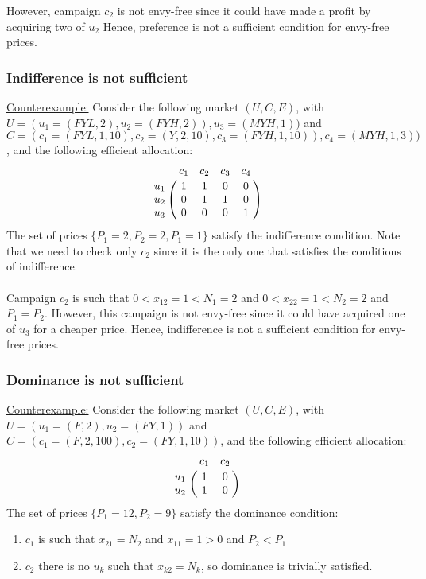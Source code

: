 \documentclass[12pt,letterpaper]{article}
\newcommand{\Campaign}{c}
\newcommand{\Campaigns}{C}
\newcommand{\User}{u}
\newcommand{\Users}{U}
\newcommand{\NumberOfUsers}{N}
\newcommand{\Edges}{E}
\newcommand{\Price}{P}
\newcommand{\AllocationMatrixEntry}{x}
\begin{document}
	However, campaign $\Campaign_{2}$ is not envy-free since it could have made a profit by acquiring two of $\User_{2}$ 
	Hence, preference is not a sufficient condition for envy-free prices.

	\subsubsection*{Indifference is not sufficient}
\underline{Counterexample:} Consider the following market $(\Users,\Campaigns,\Edges)$, with 
     $\Users =(\User_1 = (FYL, 2), \User_2 = (FYH, 2)), \User_3 = (MYH, 1))$ 
and  $\Campaigns =(\Campaign_1 = (FYL, 1,10),\Campaign_2 = (Y, 2,10), \Campaign_3 = (FYH, 1,10)), \Campaign_4 = (MYH, 1,3))$, and the following efficient allocation:
\[
		\bordermatrix{&		\Campaign_1 & \Campaign_2& \Campaign_3& \Campaign_4\cr
                	\User_1	& 1 		&  1 		& 0 		& 0 \cr
                	\User_2	& 0  		&  1		& 1 		& 0 \cr
                	\User_3	& 0		&  0		& 0 		& 1}
	\]
	The set of prices $\{\Price_1 = 2, \Price_2 = 2, \Price_1 = 1\}$ satisfy the indifference condition. Note that we need to check only $\Campaign_{2}$ since it is the only
	one that satisfies the conditions of indifference.\\\\
	Campaign $\Campaign_2$ is such that $0<\AllocationMatrixEntry_{12} = 1 < \NumberOfUsers_{1} = 2$ and $0<\AllocationMatrixEntry_{22} = 1 < \NumberOfUsers_{2} = 2$ and $\Price_1 = \Price_2$. However, this campaign is not envy-free since it
	 could have acquired one of $\User_{3}$ for a cheaper price. 
	 Hence, indifference is not a sufficient condition for envy-free prices.

\subsubsection*{Dominance is not sufficient}
\underline{Counterexample:} Consider the following market $(\Users,\Campaigns,\Edges)$, with $\Users =(\User_1 = (F, 2),\User_2 = (FY, 1))$ 
and  $\Campaigns =(\Campaign_1 = (F, 2,100),\Campaign_2 = (FY, 1,10))$, and the following efficient allocation:
\[
		\bordermatrix{&\Campaign_1 & \Campaign_2\cr
                	\User_1& 1 	&  0 \cr
                	\User_2& 1  	&  0 }
	\]
	The set of prices $\{\Price_1 = 12, \Price_2 = 9\}$ satisfy the dominance condition:
	\begin{enumerate}
	 \item $\Campaign_1$ is such that $\AllocationMatrixEntry_{21} = \NumberOfUsers_2$ and $\AllocationMatrixEntry_{11} = 1 > 0$ and $\Price_{2} < \Price_{1}$
	 \item $\Campaign_2$ there is no $\User_{k}$ such that $\AllocationMatrixEntry_{k2} = \NumberOfUsers_k$, so dominance is trivially satisfied.
	\end{enumerate}
\end{document}
